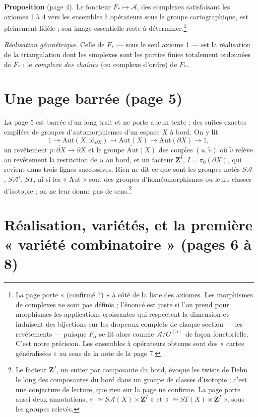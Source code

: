 \documentclass[11pt,a4paper]{article}
\begin{document}
\textbf{Proposition} (page 4). Le foncteur $F_* \mapsto \mathcal{A}$, des
complexes satisfaisant les axiomes 1 à 4 vers les ensembles à opérateurs sous
le groupe cartographique, est pleinement fidèle ; son image essentielle reste
à déterminer.\footnote{La page porte « (confirmé ?) » à côté de la liste des
axiomes. Les morphismes de complexes ne sont pas définis ; l'énoncé est
juste si l'on prend pour morphismes les applications croissantes qui
respectent la dimension et induisent des bijections sur les drapeaux
complets de chaque section --- les revêtements --- puisque $F_\alpha$ se lit
alors comme $\mathcal{A}/G^{(\alpha)}$ de façon fonctorielle. C'est notre
précision. Les ensembles à opérateurs obtenus sont des « cartes
généralisées » au sens de la note de la page 7.}

\emph{Réalisation géométrique.} Celle de $F_*$ --- sous le seul axiome 1 ---
est la réalisation de la triangulation dont les simplexes sont les parties
finies totalement ordonnées de $F_*$ : le \emph{complexe des chaînes} (ou
complexe d'ordre) de $F_*$.

\section*{Une page barrée (page 5)}

La page 5 est barrée d'un long trait et ne porte aucun texte : des suites
exactes empilées de groupes d'automorphismes d'un espace $X$ à bord. On y
lit
\[
  1 \to \mathrm{Aut}(X, \mathrm{id}_{\partial X}) \to \mathrm{Aut}(X) \to
  \mathrm{Aut}(\partial X) \to 1 ,
\]
un revêtement $p : \widetilde{\partial X} \to \partial X$ et le groupe
$\widetilde{\mathrm{Aut}}(X)$ des couples $(u, \tilde v)$ où $\tilde v$
relève au revêtement la restriction de $u$ au bord, et un facteur
$\mathbf{Z}^I$, $I = \pi_0(\partial X)$, qui revient dans trois lignes
successives. Rien ne dit ce que sont les groupes notés $S\mathcal{A}$,
$S\mathcal{A}^\circ$, $ST$, ni si les « Aut » sont des groupes
d'homéomorphismes ou leurs classes d'isotopie ; on ne leur donne pas de
sens.\footnote{Le facteur $\mathbf{Z}^I$, un entier par composante du bord,
évoque les twists de Dehn le long des composantes du bord dans un groupe de
classes d'isotopie ; c'est une conjecture de lecture, que rien sur la page ne
confirme. La page porte aussi deux annotations, « $\simeq S\mathcal{A}(X)
\times \mathbf{Z}^I$ » et « $\simeq ST(X) \times \mathbf{Z}^I$ », sous les
groupes relevés.}

\section*{Réalisation, variétés, et la première « variété combinatoire » (pages 6 à 8)}
\end{document}

